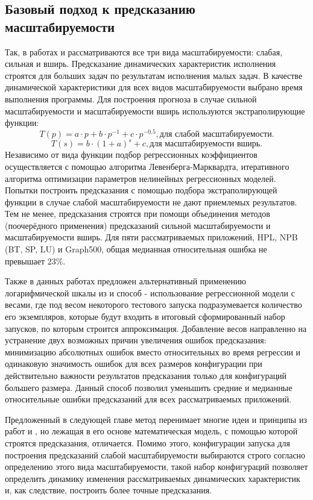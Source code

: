 	\subsection{Базовый подход к предсказанию масштабируемости}
		Так, в работах \cite{Kazmina_Antonov_article} и \cite{Kazminf_Valkon_Antonov_article} рассматриваются все три вида масштабируемости: слабая, сильная и вширь. Предсказание динамических характеристик исполнения строятся для больших задач по результатам исполнения малых задач. В качестве динамической характеристики для всех видов масштабируемости выбрано время выполнения программы. Для построения прогноза в случае сильной масштабируемости и масштабируемости вширь используются экстраполирующие функции:
		\[
		T(p) = a \cdot p + b \cdot p^{-1} + c \cdot p^{-0.5}, \text{для слабой масштабируемости}.
		\]
		\[
		T(s) = b \cdot (1 + a)^{s} + c, \text{для масштабируемости вширь}.
		\]
		Независимо от вида функции подбор регрессионных коэффициентов осуществляется с помощью алгоритма Левенберга-Марквардта, итеративного алгоритма оптимизации параметров нелинейных регрессионных моделей. Попытки построить предсказания с помощью подбора экстраполирующей функции в случае слабой масштабируемости не дают приемлемых результатов. Тем не менее, предсказания строятся при помощи объединения методов (поочерёдного применения) предсказаний сильной масштабируемости и масштабируемости вширь. Для пяти рассматриваемых приложений, HPL, NPB (BT, SP, LU) и Graph500, общая медианная относительная ошибка не превышает 23\%. 

		Также в данных работах предложен альтернативный применению логарифмической шкалы из \cite{log_main} и \cite{focused_regression} способ - использование регрессионной модели с весами, где под весом некоторого тестового запуска подразумевается количество его экземпляров, которые будут входить в итоговый сформированный набор запусков, по которым строится аппроксимация. Добавление весов направленно на устранение двух возможных причин увеличения ошибок предсказания: минимизацию абсолютных ошибок вместо относительных во время регрессии и одинаковую значимость ошибок для всех размеров конфигурации при действительно важности результатов предсказания только для конфигураций большего размера. Данный способ позволил уменьшить средние и медианные относительные ошибки предсказаний для всех рассматриваемых приложений.

		Предложенный в следующей главе метод перенимает многие идеи и принципы из работ \cite{Kazmina_Antonov_article} и \cite{Kazminf_Valkon_Antonov_article}, но лежащая в его основе математическая модель, с помощью которой строятся предсказания, отличается. Помимо этого, конфигурации запуска для построения предсказаний слабой масштабируемости выбираются строго согласно определению этого вида масштабируемости, такой набор конфигураций позволяет определить динамику изменения рассматриваемых динамических характеристик и, как следствие, построить более точные предсказания.
\clearpage